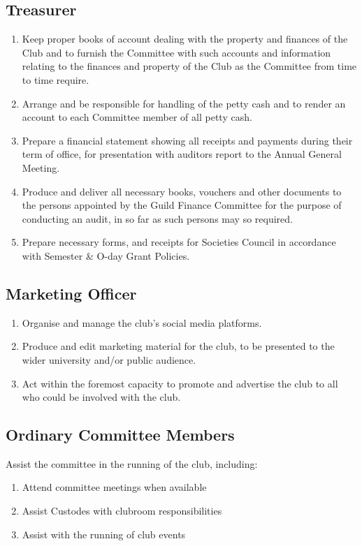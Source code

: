 \documentclass[10pt,a4paper]{report}
\begin{document}
		\subsection{Treasurer}
			\begin{enumerate}[label=\alph*]
				\item Keep proper books of account dealing with the property and finances of the Club and to furnish the Committee with such accounts and information relating to the finances and property of the Club as the Committee from time to time require.
				\item Arrange and be responsible for handling of the petty cash and to render an account to each Committee member of all petty cash.
				\item Prepare a financial statement showing all receipts and payments during their term of office, for presentation with auditors report to the Annual General Meeting.
				\item Produce and deliver all necessary books, vouchers and other documents to the persons appointed by the Guild Finance Committee for the purpose of conducting an audit, in so far as such persons may so required.
				\item Prepare necessary forms, and receipts for Societies Council in accordance with Semester \& O-day Grant Policies.
			\end{enumerate}
		\subsection{Marketing Officer}
            \begin{enumerate}[label=\alph*]
                \item Organise and manage the club's social media platforms.
                \item Produce and edit marketing material for the club, to be presented to the wider university and/or public audience.
                \item Act within the foremost capacity to promote and advertise the club to all who could be involved with the club.
            \end{enumerate}
		\subsection{Ordinary Committee Members}
			Assist the committee in the running of the club, including:
			\begin{enumerate}[label=\alph*]
				\item Attend committee meetings when available
				\item Assist Custodes with clubroom responsibilities
				\item Assist with the running of club events
			\end{enumerate}
\end{document}
